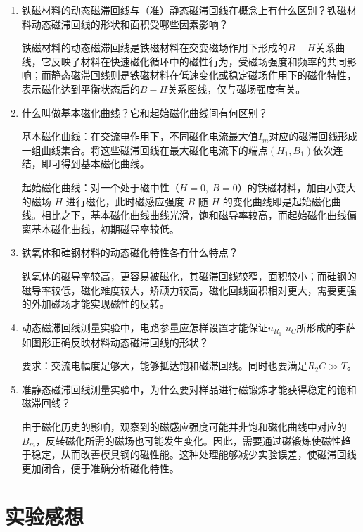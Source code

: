 \documentclass[11pt]{article}
\begin{document}
\begin{enumerate}
    \item 铁磁材料的动态磁滞回线与（准）静态磁滞回线在概念上有什么区别？铁磁材料动态磁滞回线的形状和面积受哪些因素影响？
    
    铁磁材料的动态磁滞回线是铁磁材料在交变磁场作用下形成的$B - H$关系曲线，它反映了材料在快速磁化循环中的磁性行为，受磁场强度和频率的共同影响；而静态磁滞回线则是铁磁材料在低速变化或稳定磁场作用下的磁化特性，表示磁化达到平衡状态后的$B - H$关系图线，仅与磁场强度有关。
    
    \item 什么叫做基本磁化曲线？它和起始磁化曲线间有何区别？
    
    基本磁化曲线：在交流电作用下，不同磁化电流最大值$I_m$对应的磁滞回线形成一组曲线集合。将这些磁滞回线在最大磁化电流下的端点$(H_1,B_1)$依次连结，即可得到基本磁化曲线。

    起始磁化曲线：对一个处于磁中性（$H=0,\ B=0$）的铁磁材料，加由小变大的磁场 $H$ 进行磁化，此时磁感应强度 $B$ 随 $H$ 的变化曲线即是起始磁化曲线。相比之下，基本磁化曲线曲线光滑，饱和磁导率较高，而起始磁化曲线偏离基本磁化曲线，初期磁导率较低。
    
    \item 铁氧体和硅钢材料的动态磁化特性各有什么特点？
    
    铁氧体的磁导率较高，更容易被磁化，其磁滞回线较窄，面积较小；而硅钢的磁导率较低，磁化难度较大，矫顽力较高，磁化回线面积相对更大，需要更强的外加磁场才能实现磁性的反转。

    \item 动态磁滞回线测量实验中，电路参量应怎样设置才能保证$u_{R_1}$-$u_C$所形成的李萨如图形正确反映材料动态磁滞回线的形状？
    
    要求：交流电幅度足够大，能够抵达饱和磁滞回线。同时也要满足$R_2C \gg T$。

    \item 准静态磁滞回线测量实验中，为什么要对样品进行磁锻炼才能获得稳定的饱和磁滞回线？
    
    由于磁化历史的影响，观察到的磁感应强度可能并非饱和磁化曲线中对应的$B_m$，反转磁化所需的磁场也可能发生变化。因此，需要通过磁锻炼使磁性趋于稳定，从而改善模具钢的磁性能。这种处理能够减少实验误差，使磁滞回线更加闭合，便于准确分析磁化特性。

\end{enumerate}

\section{实验感想}
\end{document}
